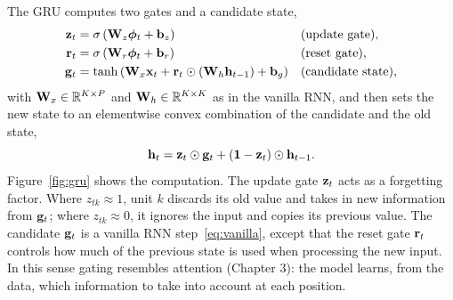 The GRU computes two gates and a candidate state,
\begin{align}
  \mathbf{z}_t &= \sigma\left(\mathbf{W}_z\boldsymbol{\phi}_t+\mathbf{b}_z\right) && \text{(update gate)},\\
  \mathbf{r}_t &= \sigma\left(\mathbf{W}_r\boldsymbol{\phi}_t+\mathbf{b}_r\right) && \text{(reset gate)},\\
  \mathbf{g}_t &= \tanh\left(\mathbf{W}_x\mathbf{x}_t + \mathbf{r}_t\odot(\mathbf{W}_h\mathbf{h}_{t-1}) + \mathbf{b}_g\right) && \text{(candidate state)},
\end{align}
with $\mathbf{W}_x\in\mathbb{R}^{K\times P}$ and $\mathbf{W}_h\in\mathbb{R}^{K\times K}$ as in the vanilla RNN, and then sets the new state to an elementwise convex combination of the candidate and the old state,
\begin{equation}
  \mathbf{h}_t = \mathbf{z}_t\odot\mathbf{g}_t + (\mathbf{1}-\mathbf{z}_t)\odot\mathbf{h}_{t-1} .
  \label{eq:gru}
\end{equation}
Figure~\ref{fig:gru} shows the computation. The update gate $\mathbf{z}_t$ acts as a forgetting factor. Where $z_{tk}\approx1$, unit $k$ discards its old value and takes in new information from $\mathbf{g}_t$; where $z_{tk}\approx0$, it ignores the input and copies its previous value. The candidate $\mathbf{g}_t$ is a vanilla RNN step~\eqref{eq:vanilla}, except that the reset gate $\mathbf{r}_t$ controls how much of the previous state is used when processing the new input. In this sense gating resembles attention (Chapter 3): the model learns, from the data, which information to take into account at each position.

